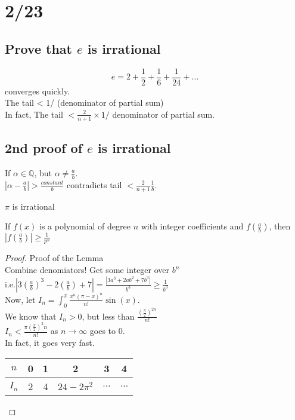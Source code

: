 \section*{2/23}
  \subsection*{Prove that $e$ is irrational}
    $$
      e = 2 + \frac{1}{2} + \frac{1}{6} + \frac{1}{24} + \ldots
    $$
    converges quickly.\\
    The tail < 1/ (denominator of partial sum)\\
    In fact, The tail $< \frac{2}{n+1} \times 1/$ denominator of partial sum.\\
  \subsection*{2nd proof of $e$ is irrational}
    If $\alpha \in \mathbb{Q}$, but $\alpha \not= \frac{a}{b}$.\\
    $|\alpha - \frac{a}{b}| > \frac{constant}{b}$ contradicts
    tail $< \frac{2}{n+1}\frac{1}{b}$.\\

  \begin{theorem}
    $\pi$ is irrational
  \end{theorem}
  \begin{lemma}
    If $f(x)$ is a polynomial of degree $n$ with integer coefficients and 
    $f(\frac{a}{b})$, then $|f(\frac{a}{b})| \ge \frac{1}{p^n}$
  \end{lemma}
  \begin{proof} Proof of the Lemma\\
    Combine denomiators! Get some integer over $b^n$\\
    i.e.$|3(\frac{a}{b})^3 - 2(\frac{a}{b}) + 7| = \frac{|3a^3 + 2ab^2 + 7b^3|}
    {b^3} \ge \frac{1}{b^3}$\\
    Now, let $I_n = \int_0^{\pi} \frac{x^n(\pi-x)^n}{n!}\sin(x)$.\\
    We know that $I_n > 0$, but less than $\frac{(\frac{\pi}{2})^{2n}}{n!}$\\
    $I_n < \frac{\pi(\frac{\pi}{2})^2n}{n!}$ as $n \to \infty$ goes to 0.\\
    In fact, it goes very fast.
    \begin{tabular}{c | c | c| c| c | c}
      $n$ & 0 & 1 & 2 & 3 & 4\\
      \hline
      $I_n$ & 2 & 4 & $24 - 2\pi^2$ & $\ldots$ & $\ldots$
    \end{tabular}
  \end{proof}

